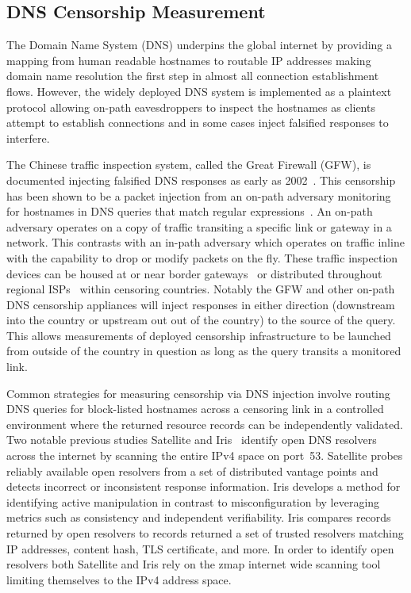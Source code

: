 \subsection{DNS Censorship Measurement}

\FigDNSCensorship

The Domain Name System (DNS) underpins the global internet by providing a
mapping from human readable hostnames to routable IP addresses making domain name
resolution the first step in almost all connection establishment flows. However,
the widely deployed DNS system is implemented as a plaintext protocol allowing
on-path eavesdroppers to inspect the hostnames as clients attempt to establish
connections and in some cases inject falsified responses to interfere.

The Chinese traffic inspection system, called the Great Firewall (GFW),
is documented injecting falsified DNS responses as early as 2002~\cite{global2002great}.
This censorship has been shown to be a packet injection from an on-path adversary
monitoring for hostnames in DNS queries that match regular
expressions~\cite{USESEC21:GFWatch}. An on-path adversary
operates on a copy of traffic transiting a specific link or gateway in a network.
This contrasts with an in-path adversary which operates on traffic inline with
the capability to drop or modify packets on the fly. These traffic inspection
devices can be housed at or near border gateways~\cite{xu2011internet} or
distributed throughout regional ISPs~\cite{ramesh2020decentralized} within
censoring countries. Notably the GFW and other on-path DNS censorship appliances
will inject responses in either direction (downstream into the country or
upstream out out of the country) to the source of the query. This allows
measurements of deployed censorship infrastructure to be launched from outside
of the country in question as long as the query transits a monitored link.

Common strategies for measuring censorship via DNS injection involve routing DNS queries for
block-listed hostnames across a censoring link in a controlled environment where
the returned resource records can be independently validated. Two notable previous
studies Satellite and Iris~\cite{scott2016satellite,pearce2017global} identify
open DNS resolvers across the internet by scanning the entire IPv4 space on port~53.
Satellite probes reliably available open resolvers from a set of distributed vantage
points and detects incorrect or inconsistent response information. Iris develops
a method for identifying active manipulation in contrast to misconfiguration by
leveraging metrics such as consistency and independent verifiability. Iris
compares records returned by open resolvers to records returned a set of trusted
resolvers matching IP addresses, content hash, TLS certificate, and more.
In order to identify open resolvers both Satellite and Iris rely on the zmap
internet wide scanning tool~\cite{Durumeric13zmap} limiting themselves to the IPv4 address space.

